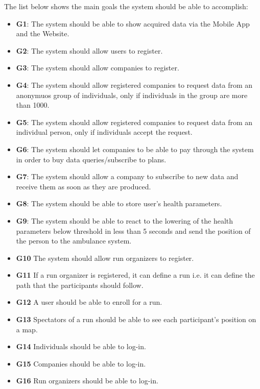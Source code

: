 The list below shows the main goals the system should be able to accomplish:

\begin{itemize}
    \item \textbf{G1}: The system should be able to show acquired data via the Mobile App and the Website.
    \item \textbf{G2}: The system should allow users to register.
    \item \textbf{G3}: The system should allow companies to register.
    \item \textbf{G4}: The system should allow registered companies to request data from an anonymuos group of individuals, only if individuals in the group are more than 1000.
    \item \textbf{G5}: The system should allow registered companies to request data from an individual person, only if individuals accept the request.

    \item \textbf{G6}: The system should let companies to be able to pay through the system in order to buy data queries/subscribe to plans.

    \item \textbf{G7}: The system should allow a company to subscribe to new data and receive them as soon as they are produced.
    \item \textbf{G8}: The system should be able to store user's health parameters.
    \item \textbf{G9}: The system should be able to react to the lowering of the health parameters below threshold in less than 5 seconds and send the position of the person to the ambulance system. 
    
    \item \textbf{G10} The system should allow run organizers to register.
    \item \textbf{G11} If a run organizer is registered, it can define a run i.e. it can define the path that the participants should follow.
    \item \textbf{G12} A user should be able to enroll for a run.
    \item \textbf{G13} Spectators of a run should be able to see each participant's position on a map.
    \item \textbf{G14} Individuals should be able to log-in.
    \item \textbf{G15} Companies should be able to log-in.
    \item \textbf{G16} Run organizers should be able to log-in.

\end{itemize}





